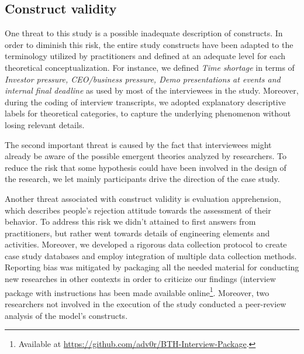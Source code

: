 \documentclass[10pt,journal,letterpaper,compsoc]{IEEEtran}
\begin{document}
\subsection{Construct validity}
One threat to this study is a possible inadequate description of constructs. In 
order to diminish this risk, the entire study constructs have been adapted to 
the terminology utilized by practitioners and defined at an adequate level for 
each theoretical conceptualization. For instance, we defined \textit{Time 
shortage} in terms of \textit{Investor pressure, CEO/business 
pressure, Demo presentations at events and internal final deadline} as used by 
most of the interviewees in the study. 
Moreover, during the coding of interview transcripts, we adopted explanatory 
descriptive labels for theoretical categories, to capture the underlying 
phenomenon without losing relevant details.

The second important threat is caused by the fact that interviewees might 
already be aware of the possible emergent theories analyzed by researchers. To 
reduce the risk that some hypothesis could have been involved in the design of 
the research, we let mainly participants drive the direction of the case study.

Another threat associated with construct validity is evaluation 
apprehension, which describes people's rejection attitude towards the 
assessment of their behavior. 
To address this risk we didn't attained to first answers from practitioners, but 
rather went towards details of engineering elements and activities. %
Moreover, we developed a rigorous data collection protocol to create case study 
databases and employ integration of multiple data collection methods.%
Reporting bias was mitigated by packaging all the needed 
material for conducting new researches in other contexts in order to criticize 
our findings (interview package with instructions has been made available 
online\footnote{Available at 
\url{https://github.com/adv0r/BTH-Interview-Package}.}. %
Moreover, two researchers not involved in the execution of the study conducted 
a peer-review analysis of the model's constructs.
\end{document}

